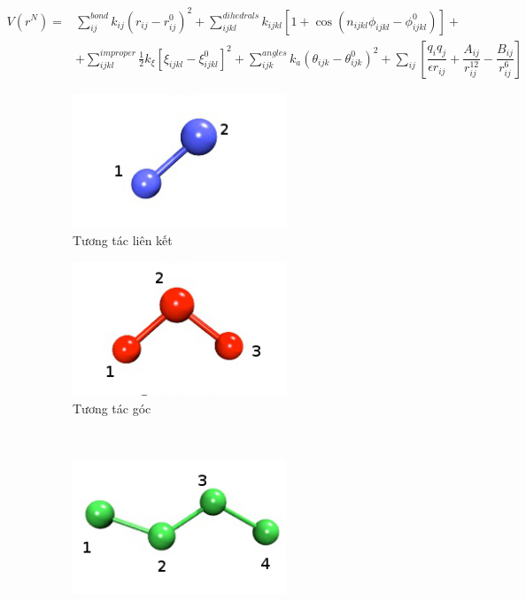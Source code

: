 \documentclass[12pt,a4paper,reqno, oneside]{book}
\begin{document}
		\begin{align}
		V(r^{N}) =& \sum_{ij}^{bond}k_{ij}\left(r_{ij} - r_{ij}^{0}\right)^{2} +\sum_{ijkl}^{dihedrals}k_{ijkl}\left[1+\cos\left(n_{ijkl}\phi_{ijkl}-\phi_{ijkl}^{0}\right)\right] +\nonumber\\
			&+ \sum_{ijkl}^{improper}\frac{1}{2} k_{\xi}\left[\xi_{ijkl}-\xi_{ijkl}^{0}\right]^{2} + \sum_{ijk}^{angles}k_{a}(\theta_{ijk}-\theta_{ijk}^{0})^{2}+ \sum_{ij}\left[\dfrac{q_{i} q_{j}}{\epsilon r_{ij}}+\dfrac{A_{ij}}{r_{ij}^{12}}-\dfrac{B_{ij}}{r_{ij}^{6}}\right]
		\label{ff}
		\end{align}
		\begin{figure}
		\begin{subfigure}{0.5\textwidth}
		\includegraphics[width=0.7\textwidth,natwidth=610,natheight=642]{ff/12}
		\caption{Tương tác liên kết}
		\label{fig:12}
		\end{subfigure}
		\begin{subfigure}{0.5\textwidth}
		\includegraphics[width=0.7\textwidth,natwidth=610,natheight=642]{ff/13}
		\caption{Tương tác góc}
		\label{fig:13}
		\end{subfigure}\\
		\begin{subfigure}{0.5\textwidth}
		\includegraphics[width=0.7\textwidth,natwidth=610,natheight=642]{ff/14}

\end{subfigure}
\end{figure}
\end{document}
